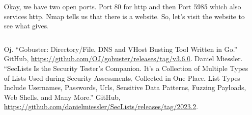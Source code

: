 \documentclass[conference]{IEEEtran}
\begin{document}
Okay, we have two open ports. Port 80 for http and then Port 5985 which also services http. Nmap tells us that there is a website. So, let's visit the website to see what gives.



\begin{scriptsize}
\begin{verbatim}

\end{verbatim}
\end{scriptsize}


\begin{thebibliography}{00}

 Oj. “Gobuster: Directory/File, DNS and VHost Busting Tool Written in Go.” GitHub, \url{https://github.com/OJ/gobuster/releases/tag/v3.6.0}.
 Daniel Miessler. “SecLists Is the Security Tester’s Companion. It’s a Collection of Multiple Types of Lists Used during Security Assessments, Collected in One Place. List Types Include Usernames, Passwords, Urls, Sensitive Data Patterns, Fuzzing Payloads, Web Shells, and Many More.” GitHub, \url{https://github.com/danielmiessler/SecLists/releases/tag/2023.2}.

\end{thebibliography}
\vspace{12pt}
\end{document}
